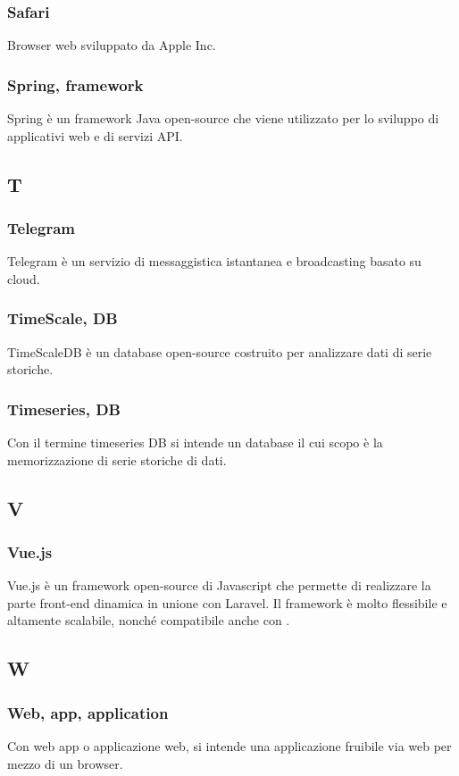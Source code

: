 \subsubsection*{Safari}
Browser web sviluppato da Apple Inc.
\subsubsection*{Spring, framework}  Spring è un framework Java open-source che viene utilizzato per lo sviluppo di applicativi web e di servizi API.
\subsection{T}
\subsubsection*{Telegram}  Telegram è un servizio di messaggistica istantanea e broadcasting basato su cloud.
\subsubsection*{TimeScale, DB}  TimeScaleDB è un database open-source costruito per analizzare dati di serie storiche.
\subsubsection*{Timeseries, DB}  Con il termine timeseries DB si intende un database il cui scopo è la memorizzazione di serie storiche di dati.
\subsection{V}
\subsubsection*{Vue.js}  Vue.js è un framework open-source di Javascript che permette di realizzare la parte front-end dinamica in unione con Laravel. Il framework è molto flessibile e altamente scalabile, nonché compatibile anche con .
\subsection{W}
\subsubsection*{Web, app, application}
Con web app o applicazione web, si intende una applicazione fruibile via web per mezzo di un browser.